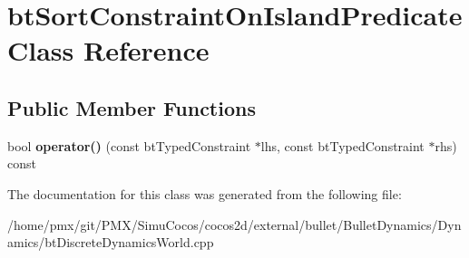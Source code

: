 \hypertarget{classbtSortConstraintOnIslandPredicate}{}\section{bt\+Sort\+Constraint\+On\+Island\+Predicate Class Reference}
\label{classbtSortConstraintOnIslandPredicate}
\subsection*{Public Member Functions}
\begin{DoxyCompactItemize}
\item 
\mbox{\label{classbtSortConstraintOnIslandPredicate_af7faf75e3297c5a27de305fa5a1aff3a}} 
bool {\bfseries operator()} (const bt\+Typed\+Constraint $\ast$lhs, const bt\+Typed\+Constraint $\ast$rhs) const
\end{DoxyCompactItemize}


The documentation for this class was generated from the following file\+:\begin{DoxyCompactItemize}
\item 
/home/pmx/git/\+P\+M\+X/\+Simu\+Cocos/cocos2d/external/bullet/\+Bullet\+Dynamics/\+Dynamics/bt\+Discrete\+Dynamics\+World.\+cpp\end{DoxyCompactItemize}
